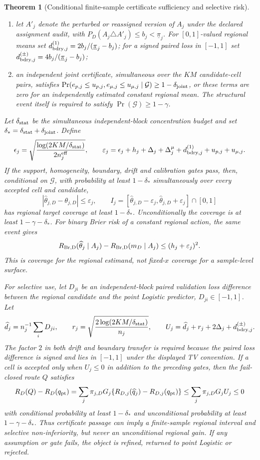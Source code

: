 \documentclass[11pt,a4paper]{article}
\newcommand{\E}{\mathbb E}\newcommand{\Pp}{\mathbb P}
\numberwithin{equation}{section}
\newtheorem{theorem}{Theorem}[section]
\theoremstyle{definition}\newtheorem{definition}[theorem]{Definition}
\theoremstyle{remark}\newtheorem{remark}[theorem]{Remark}
\begin{document}
\begin{theorem}[Conditional finite-sample certificate sufficiency and selective risk]
\begin{enumerate}[label=(A\arabic*)]
where throughout this theorem
$\operatorname{TV}(P,Q)=\sup_{0\leq f\leq1}|\E_Pf-\E_Qf|$;
\item let $A'_j$ denote the perturbed or reassigned version of $A_j$ under the declared
assignment audit, with $P_D(A_j\triangle A'_j)\leq b_j<\underline\pi_j$. For $[0,1]$-valued
regional means set $d^{(1)}_{{\rm bdry},j}=2b_j/(\underline\pi_j-b_j)$;
for a signed paired loss in $[-1,1]$ set
$d^{(\pm)}_{{\rm bdry},j}=4b_j/(\underline\pi_j-b_j)$;
\item an independent joint certificate, simultaneous over the $KM$ candidate-cell
pairs, satisfies
$\Pr(e_{p,j}\leq u_{p,j},e_{\mu,j}\leq u_{\mu,j}\mid\mathcal G)\geq 1-\delta_{\rm joint}$, or these terms are zero for an independently estimated
constant regional mean. The structural event itself is required to satisfy
$\Pr(\mathcal G)\geq1-\gamma$.
\end{enumerate}
Let $\delta_{\rm stat}$ be the simultaneous independent-block concentration
budget and set $\delta_*=\delta_{\rm stat}+\delta_{\rm joint}$. Define
\[
 \epsilon_j=\sqrt{\frac{\log(2KM/\delta_{\rm stat})}{2n^{\rm eff}_j}},\qquad
 \varepsilon_j=\epsilon_j+h_j+\Delta_j+\Delta^{\mu}_j
 +d^{(1)}_{{\rm bdry},j}+u_{p,j}+u_{\mu,j}.
\]
If the support, homogeneity, boundary, drift and calibration gates pass, then,
conditional on $\mathcal G$, with probability at least $1-\delta_*$
simultaneously over every accepted cell and candidate,
\[
 |\widehat\theta_{j,D}-\theta_{j,D}|\leq\varepsilon_j,
 \qquad I_j=[\widehat\theta_{j,D}-\varepsilon_j,
             \widehat\theta_{j,D}+\varepsilon_j]\cap[0,1]
\]
has regional target coverage at least $1-\delta_*$. Unconditionally the
coverage is at least $1-\gamma-\delta_*$. For binary Brier risk of a
constant regional action, the same event gives
\[
 R_{\rm Br,D}(\widehat\theta_j\mid A_j)-R_{\rm Br,D}(m_D\mid A_j)
 \leq (h_j+\varepsilon_j)^2.
\]
This is coverage for the regional estimand, not fixed-$x$ coverage for a
sample-level surface.

For selective use, let $D_{ji}$ be an independent-block paired validation loss
difference between the regional candidate and the point Logistic predictor,
$D_{ji}\in[-1,1]$. Let
\[
 \widehat d_j=n_j^{-1}\sum_iD_{ji},\qquad
 r_j=\sqrt{\frac{2\log(2KM/\delta_{\rm stat})}{n_j}},\qquad
 U_j=\widehat d_j+r_j+2\Delta_j+d^{(\pm)}_{{\rm bdry},j}.
\]
The factor $2$ in both drift and boundary transfer is required because the
paired loss difference is signed and lies in $[-1,1]$ under the displayed TV
convention. If a cell is accepted only when $U_j\leq0$ in addition to the
preceding gates, then the fail-closed route $Q$ satisfies
\[
 R_D(Q)-R_D(q_{\rm pt})
 =\sum_j\pi_{j,D}G_j\{R_{D,j}(\widehat q_j)-R_{D,j}(q_{\rm pt})\}
 \leq\sum_j\pi_{j,D}G_jU_j\leq0
\]
with conditional probability at least $1-\delta_*$ and unconditional
probability at least $1-\gamma-\delta_*$. Thus certificate passage can imply
a finite-sample regional interval and selective non-inferiority, but never an
unconditional regional gain. If any assumption or gate fails, the object is
refined, returned to point Logistic or rejected.
\end{theorem}
\end{document}
